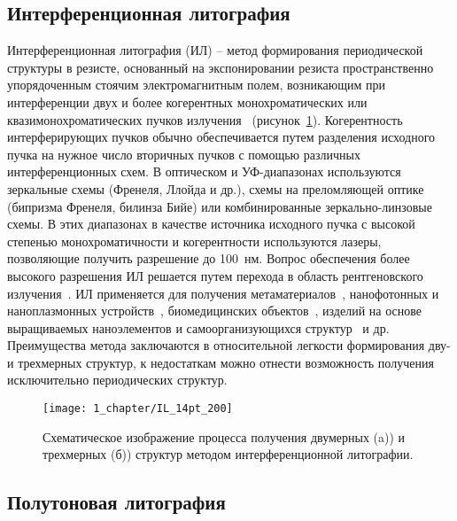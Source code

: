 \subsection{Интерференционная литография}

Интерференционная литография (ИЛ) -- метод формирования периодической структуры в резисте, основанный на экспонировании резиста пространственно упорядоченным стоячим электромагнитным полем, возникающим при интерференции двух и более когерентных монохроматических или квазимонохроматических пучков излучения~\cite{IL_general} (рисунок~\ref{fig:IL}). Когерентность интерферирующих пучков обычно обеспечивается путем разделения исходного пучка на нужное число вторичных пучков с помощью различных интерференционных схем. В оптическом и УФ-диапазонах используются зеркальные схемы (Френеля, Ллойда и др.), схемы на преломляющей оптике (бипризма Френеля, билинза Бийе) или комбинированные зеркально-линзовые схемы. В этих диапазонах в качестве источника исходного пучка с высокой степенью монохроматичности и когерентности используются лазеры, позволяющие получить разрешение до 100~нм. Вопрос обеспечения более высокого разрешения ИЛ решается путем перехода в область рентгеновского излучения~\cite{IL_X-ray}. ИЛ применяется для получения  метаматериалов~\cite{IL_metamaterials}, нанофотонных и наноплазмонных устройств~\cite{IL_nanophotonics}, биомедицинских объектов~\cite{IL_biomedical}, изделий на основе выращиваемых наноэлементов и самоорганизующихся структур~\cite{IL_self-assembly} и др. Преимущества метода заключаются в относительной легкости формирования дву- и трехмерных структур, к недостаткам можно отнести возможность получения исключительно периодических структур.

\begin{figure}[t]
	\centering
	\texttt{[image: 1\_chapter/IL\_14pt\_200]}
	\vspace{0.5em}
	\caption{Схематическое изображение процесса получения двумерных (a)) и трехмерных (б)) структур методом интерференционной литографии.}
	\label{fig:IL}
\end{figure}


\subsection{Полутоновая литография}

